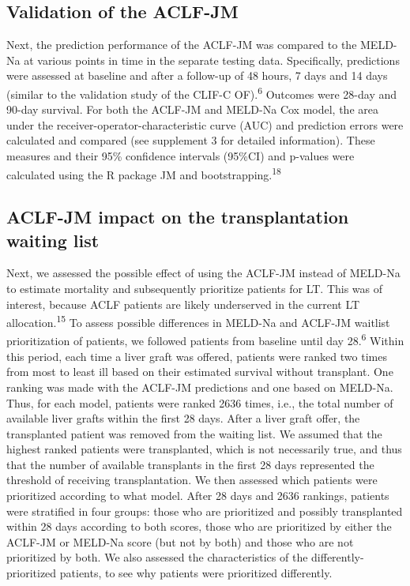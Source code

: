 \documentclass[11pt,english,]{book} %
\begin{document}
\hypertarget{validation-of-the-aclf-jm}{%
\subsection*{Validation of the ACLF-JM}\label{validation-of-the-aclf-jm}}

Next, the prediction performance of the ACLF-JM was compared to the MELD-Na at various points in time in the separate testing data. Specifically, predictions were assessed at baseline and after a follow-up of 48 hours, 7 days and 14 days (similar to the validation study of the CLIF-C OF).\textsuperscript{6} Outcomes were 28-day and 90-day survival. For both the ACLF-JM and MELD-Na Cox model, the area under the receiver-operator-characteristic curve (AUC) and prediction errors were calculated and compared (see supplement 3 for detailed information). These measures and their 95\% confidence intervals (95\%CI) and p-values were calculated using the R package JM and bootstrapping.\textsuperscript{18}

\hypertarget{aclf-jm-impact-on-the-transplantation-waiting-list}{%
\subsection*{ACLF-JM impact on the transplantation waiting list}\label{aclf-jm-impact-on-the-transplantation-waiting-list}}

Next, we assessed the possible effect of using the ACLF-JM instead of MELD-Na to estimate mortality and subsequently prioritize patients for LT. This was of interest, because ACLF patients are likely underserved in the current LT allocation.\textsuperscript{15} To assess possible differences in MELD-Na and ACLF-JM waitlist prioritization of patients, we followed patients from baseline until day 28.\textsuperscript{6} Within this period, each time a liver graft was offered, patients were ranked two times from most to least ill based on their estimated survival without transplant. One ranking was made with the ACLF-JM predictions and one based on MELD-Na. Thus, for each model, patients were ranked 2636 times, i.e., the total number of available liver grafts within the first 28 days. After a liver graft offer, the transplanted patient was removed from the waiting list. We assumed that the highest ranked patients were transplanted, which is not necessarily true, and thus that the number of available transplants in the first 28 days represented the threshold of receiving transplantation. We then assessed which patients were prioritized according to what model. After 28 days and 2636 rankings, patients were stratified in four groups: those who are prioritized and possibly transplanted within 28 days according to both scores, those who are prioritized by either the ACLF-JM or MELD-Na score (but not by both) and those who are not prioritized by both. We also assessed the characteristics of the differently-prioritized patients, to see why patients were prioritized differently.
\end{document}
